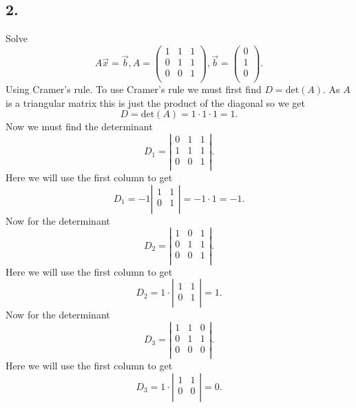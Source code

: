 \subsection*{2.}
Solve
\[ 
A \Vec{x} = \Vec{b}, A = \begin{pmatrix}
1 & 1 & 1\\
0 & 1 & 1\\
0 & 0 & 1\\
\end{pmatrix}, \Vec{b} = \begin{pmatrix}
0\\
1\\
0\\
\end{pmatrix}
.\]
Using Cramer's rule.
\bigbreak
To use Cramer's rule we must first find $D = \mathrm{det}(A)$. As $A$ is a triangular matrix this is just the product of the diagonal so we get
\[ 
D = \mathrm{det}(A) = 1\cdot 1\cdot 1 = 1
.\]
Now we must find the determinant
\[ 
D_1 = \left| \begin{array}{ccc}
0 & 1 & 1\\
1 & 1 & 1\\
0 & 0 & 1\\
\end{array} \right|
.\]
Here we will use the first column to get
\[ 
  D_1 = - 1 \left| \begin{array}{cc}
  1 & 1\\
  0 & 1\\
  \end{array} \right| = -1 \cdot 1 = -1
.\]
Now for the determinant
\[ 
D_2 = \left| \begin{array}{ccc}
1 & 0 & 1\\
0 & 1 & 1\\
0 & 0 & 1\\
\end{array} \right|
.\]
Here we will use the first column to get
\[ 
D_2 = 1 \cdot \left| \begin{array}{cc}
1 & 1\\
0 & 1\\
\end{array} \right| = 1
.\]
Now for the determinant
\[ 
D_3 = \left| \begin{array}{ccc}
1 & 1 & 0\\
0 & 1 & 1\\
0 & 0 & 0\\
\end{array} \right|
.\]
Here we will use the first column to get
\[ 
D_3 = 1 \cdot \left| \begin{array}{cc}
1 & 1\\
0 & 0\\
\end{array} \right| = 0
.\]
